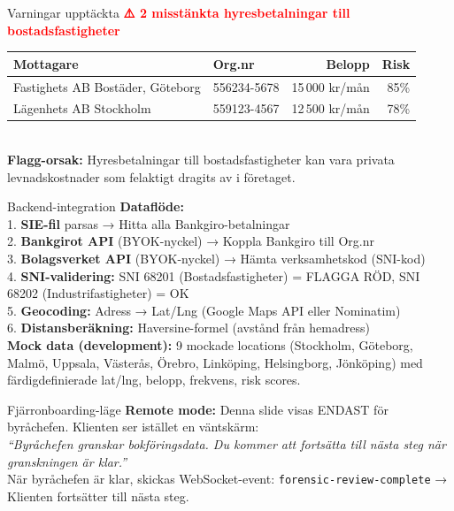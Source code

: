 \documentclass[10pt]{beamer}
\begin{document}
\begin{frame}[label=penningflodes]
  \vspace{0.4cm}
  \begin{alertblock}{Varningar upptäckta}
    \textcolor{red}{\textbf{⚠️ 2 misstänkta hyresbetalningar till bostadsfastigheter}}\\
    \vspace{0.2cm}
    \footnotesize
    \begin{tabular}{|l|l|r|r|}
      \hline
      \textbf{Mottagare} & \textbf{Org.nr} & \textbf{Belopp} & \textbf{Risk} \\
      \hline
      Fastighets AB Bostäder, Göteborg & 556234-5678 & 15\,000 kr/mån & 85\% \\
      \hline
      Lägenhets AB Stockholm & 559123-4567 & 12\,500 kr/mån & 78\% \\
      \hline
    \end{tabular}
    \vspace{0.2cm}\\
    \textbf{Flagg-orsak:} Hyresbetalningar till bostadsfastigheter kan vara privata levnadskostnader som felaktigt dragits av i företaget.
  \end{alertblock}
  
  \vspace{0.4cm}
  \begin{block}{Backend-integration}
    \footnotesize
    \textbf{Dataflöde:}\\
    1. \textbf{SIE-fil} parsas → Hitta alla Bankgiro-betalningar\\
    2. \textbf{Bankgirot API} (BYOK-nyckel) → Koppla Bankgiro till Org.nr\\
    3. \textbf{Bolagsverket API} (BYOK-nyckel) → Hämta verksamhetskod (SNI-kod)\\
    4. \textbf{SNI-validering:} SNI 68201 (Bostadsfastigheter) = FLAGGA RÖD, SNI 68202 (Industrifastigheter) = OK\\
    5. \textbf{Geocoding:} Adress → Lat/Lng (Google Maps API eller Nominatim)\\
    6. \textbf{Distansberäkning:} Haversine-formel (avstånd från hemadress)
    \vspace{0.2cm}\\
    \textbf{Mock data (development):} 9 mockade locations (Stockholm, Göteborg, Malmö, Uppsala, Västerås, Örebro, Linköping, Helsingborg, Jönköping) med färdigdefinierade lat/lng, belopp, frekvens, risk scores.
  \end{block}
  
  \vspace{0.4cm}
  \begin{block}{Fjärronboarding-läge}
    \footnotesize
    \textbf{Remote mode:} Denna slide visas ENDAST för byråchefen. Klienten ser istället en väntskärm:\\
    \vspace{0.2cm}
    \textit{``Byråchefen granskar bokföringsdata. Du kommer att fortsätta till nästa steg när granskningen är klar.''}\\
    \vspace{0.2cm}
    När byråchefen är klar, skickas WebSocket-event: \texttt{forensic-review-complete} → Klienten fortsätter till nästa steg.
  \end{block}
  

\end{frame}
\end{document}
